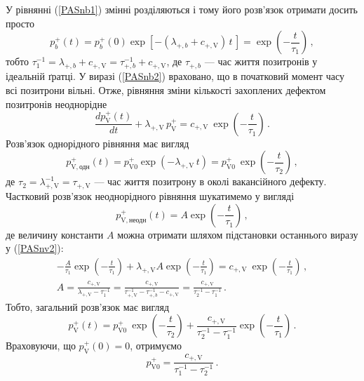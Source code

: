 \documentclass[10pt,a5paper,titlepage,oneside]{book}
\numberwithin{equation}{part}
\begin{document}
У рівнянні (\ref{PASnb1}) змінні розділяються і тому його розв'язок отримати досить просто
\begin{equation}\label{PASnb2}
p_{b}^+(t)=p_{b}^+(0)\exp\left[-(\lambda_{+,b}+c_{+,\mathrm{V}})\,t\,\right]=\exp\left(-\frac{t}{\tau_1}\right)\,,
\end{equation}
тобто $\tau_1^{-1}=\lambda_{+,b}+c_{+,\mathrm{V}}=\tau_{+,b}^{-1}+c_{+,\mathrm{V}}$,
де $\tau_{+,b}$ --- час життя позитронів у ідеальній ґратці.
У виразі (\ref{PASnb2}) враховано, що в початковий момент часу всі позитрони вільні.
Отже, рівняння зміни кількості захоплених дефектом позитронів неоднорідне
\begin{equation}\label{PASnv2}
\frac{dp_{\mathrm{V}}^+(t)}{dt}+\lambda_{+,\mathrm{V}}\,p_{\mathrm{V}}^+=c_{+,\mathrm{V}}\:\exp\left(-\frac{t}{\tau_1}\right)\,.
\end{equation}
Розв'язок однорідного рівняння має вигляд
\begin{equation}
p_{\mathrm{V},\mbox{одн}}^+(t)=p_{\mathrm{V}0}^+\exp\left(-\lambda_{+,\mathrm{V}}\,t\right)
  =p_{\mathrm{V}0}^+\:\exp\left(-\frac{t}{\tau_2}\right)\,,
\end{equation}
де $\tau_2=\lambda_{+,\mathrm{V}}^{-1}=\tau_{+,\mathrm{V}}$ --- час життя позитрону в околі вакансійного дефекту.
Частковий розв'язок неоднорідного рівняння шукатимемо у вигляді
\begin{equation}
p_{\mathrm{V},\mbox{неодн}}^+(t)=A\exp\left(-\frac{t}{\tau_1}\right)\,,
\end{equation}
де величину константи $A$ можна отримати шляхом підстановки останнього виразу у (\ref{PASnv2}):
\begin{gather*}
-\frac{A}{\tau_1}\exp\left(-\frac{t}{\tau_1}\right)+\lambda_{+,\mathrm{V}}A\exp\left(-\frac{t}{\tau_1}\right)=c_{+,\mathrm{V}}\:\exp\left(-\frac{t}{\tau_1}\right)\,,\\
A=\frac{c_{+,\mathrm{V}}}{\lambda_{+,\mathrm{V}}-\tau_1^{-1}}= \frac{c_{+,\mathrm{V}}}{\tau_{+,\mathrm{V}}^{-1}-\tau_{+,b}^{-1}-c_{+,\mathrm{V}}}
=\frac{c_{+,\mathrm{V}}}{\tau_2^{-1}-\tau_1^{-1}}\,.
\end{gather*}
Тобто, загальний розв'язок має вигляд
\begin{equation}\label{PASnb3}
p_{\mathrm{V}}^+(t)=p_{\mathrm{V}0}^+\:\exp\left(-\frac{t}{\tau_2}\right)+\frac{c_{+,\mathrm{V}}}{\tau_2^{-1}-\tau_1^{-1}}\exp\left(-\frac{t}{\tau_1}\right)\,.
\end{equation}
Враховуючи,
що $p_{\mathrm{V}}^+(0)=0$, отримуємо
\begin{equation}\label{PASnb4}
p_{\mathrm{V}0}^+=\frac{c_{+,\mathrm{V}}}{\tau_1^{-1}-\tau_2^{-1}}\,.
\end{equation}
\end{document}

